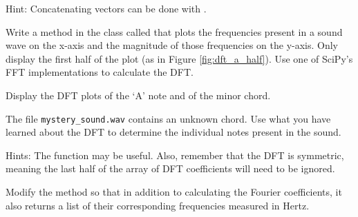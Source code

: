 Hint: Concatenating vectors can be done with .

Write a method in the  class called  that plots the frequencies present in a sound wave on the x-axis and the magnitude of those frequencies on the y-axis. 
Only display the first half of the plot (as in Figure \ref{fig:dft_a_half}).
Use one of SciPy's FFT implementations to calculate the DFT.

Display the DFT plots of the `A' note and of the minor chord.

The file \texttt{mystery\_sound.wav} contains an unknown chord.
Use what you have learned about the DFT to determine the individual notes present in the sound.

Hints: The function  may be useful. Also, remember that the DFT is symmetric, meaning the last half of the array of DFT coefficients will need to be ignored.

Modify the  method so that in addition to calculating the Fourier coefficients, it also returns a list of their corresponding frequencies measured in Hertz.
